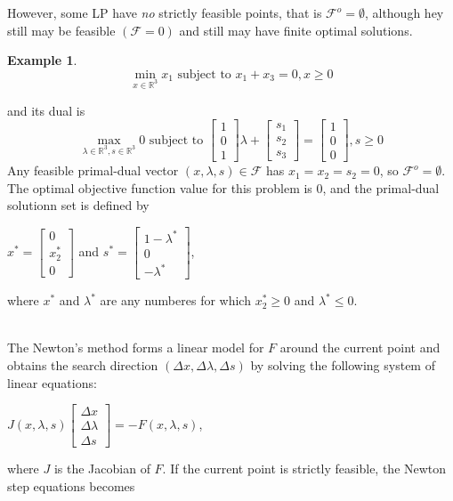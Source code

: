 \documentclass[a4paper,10 pt,titlepage,twoside]{book}
\theoremstyle{plain}
\theoremstyle{definition}
\newtheorem{ex}[thm]{Example}
\theoremstyle{remark}
\begin{document}
However, some LP have \textit{no} strictly feasible points, that is $\mathcal{F}^{o}=\emptyset$, although hey still may be feasible $(\mathcal{F}=0)$ and still may have finite optimal solutions.
\begin{ex}
	\begin{equation*}
	\min\limits_{x\in\mathbb{R}^{3}} x_{1} \text{ subject to }x_{1} + x_{3} = 0, x\geq0
	\end{equation*}

and its dual is 
	\begin{equation*}
\max\limits_{\lambda\in\mathbb{R}^{3}, s\in\mathbb{R}^{3}} 0 \text{ subject to } \begin{bmatrix}1\\0\\1\end{bmatrix}\lambda+\begin{bmatrix}
s_{1}\\s_{2}\\s_{3}
\end{bmatrix}=\begin{bmatrix}1\\0\\0\end{bmatrix}, s\geq0 
\end{equation*}
Any feasible primal-dual vector $(x, \lambda, s)\in\mathcal{F}$ has $x_{1}= x_{2}= s_{2}= 0$, so $\mathcal{F}^{o}=\emptyset$. The optimal objective function value for this problem is 0, and the primal-dual solutionn set is defined by
\begin{center}
$x^{*} = \begin{bmatrix}
0\\x^{*}_{2}\\ 0
\end{bmatrix}$ and $s^{*}=\begin{bmatrix}
1-\lambda^{*}\\0\\-\lambda^{*}
\end{bmatrix}$,  
\end{center}
where $x^{*}$ and $\lambda^{*}$ are any numberes for which $x_{2}^{*}\geq0$ and $\lambda^{*}\leq0$.
\end{ex}
\\
The Newton's method forms a linear model for $\mathit{F}$ around the current point and obtains the search direction $(\Delta x,\Delta \lambda,\Delta s)$ by solving the following system of linear equations:
\begin{center}
	$\mathit{J}(x,\lambda,s)\begin{bmatrix}
	\Delta x\\\Delta\lambda \\\Delta s
	\end{bmatrix}=-\mathit{F}(x,\lambda,s)$,
\end{center}
where $\mathit{J}$ is the Jacobian of $\mathit{F}$. If the current point is strictly feasible, the Newton step equations becomes
\end{document}
